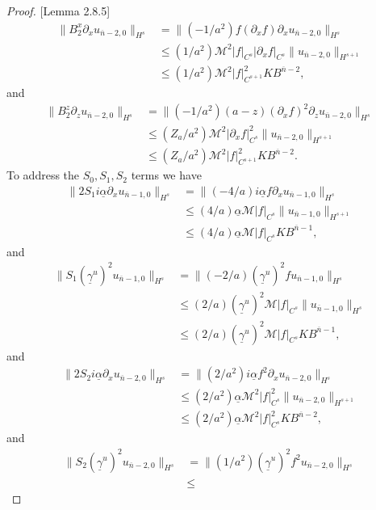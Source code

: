 \begin{proof}{[Lemma 2.8.5]}
\begin{align*}
\|B_2^{x}\partial_x u_{\overline{n}-2,0}\|_{H^{s}} &= 
\|(-1/a^2)f(\partial_x f)\partial_x u_{\overline{n}-2,0}\|_{H^{s}}\\&\le
(1/a^2)\mathcal{M}^2|f|_{C^{s}}|\partial_x f|_{C^{s}}\|u_{\overline{n}-2, 0}\|_{H^{s+1}} \\&\le
(1/a^2)\mathcal{M}^2|f|_{C^{s+1}}^2KB^{\overline{n}-2},
\end{align*}
and
\begin{align*}
\|B_2^{z}\partial_z u_{\overline{n}-2,0}\|_{H^{s}} &= 
\|(-1/a^2)(a-z)(\partial_x f)^2\partial_z u_{\overline{n}-2,0}\|_{H^{s}}\\&\le
(Z_a/a^2)\mathcal{M}^2|\partial_x f|_{C^{s}}^2\|u_{\overline{n}-2, 0}\|_{H^{s+1}} \\&\le
(Z_a/a^2)\mathcal{M}^2|f|_{C^{s+1}}^2KB^{\overline{n}-2}.
\end{align*}
To address the $S_0,S_1,S_2$ terms we have
\begin{align*}
\|2S_1i\underline{\alpha}\partial_xu_{\overline{n}-1,0}\|_{H^{s}}&=\|(-4/a)i\underline{\alpha}f\partial_xu_{\overline{n}-1,0}\|_{H^{s}}\\&\le
(4/a)\underline{\alpha}\mathcal{M}|f|_{C^{s}}\|u_{\overline{n}-1, 0}\|_{H^{s+1}}\\&\le
(4/a)\underline{\alpha}\mathcal{M}|f|_{C^{s}}KB^{\overline{n}-1},
\end{align*}
and
\begin{align*}
\|S_1(\underline{\gamma}^u)^2u_{\overline{n}-1,0}\|_{H^{s}}&=\|(-2/a)(\underline{\gamma}^u)^2fu_{\overline{n}-1,0}\|_{H^{s}}\\&\le
(2/a)(\underline{\gamma}^u)^2\mathcal{M}|f|_{C^{s}}\|u_{\overline{n}-1, 0}\|_{H^{s}}\\&\le
(2/a)(\underline{\gamma}^u)^2\mathcal{M}|f|_{C^{s}}KB^{\overline{n}-1},
\end{align*}
and
\begin{align*}
\|2S_2i\underline{\alpha}\partial_xu_{\overline{n}-2,0}\|_{H^{s}}&=\|(2/a^2)i\underline{\alpha}f^2\partial_xu_{\overline{n}-2,0}\|_{H^{s}}\\&\le
(2/a^2)\underline{\alpha}\mathcal{M}^2|f|_{C^{s}}^2\|u_{\overline{n}-2, 0}\|_{H^{s+1}}\\&\le
(2/a^2)\underline{\alpha}\mathcal{M}^2|f|_{C^{s}}^2KB^{\overline{n}-2},
\end{align*}
and
\begin{align*}
\|S_2(\underline{\gamma}^u)^2u_{\overline{n}-2,0}\|_{H^{s}}&=\|(1/a^2)(\underline{\gamma}^u)^2f^2u_{\overline{n}-2,0}\|_{H^{s}}\\&\le

\end{align*}
\end{proof}
